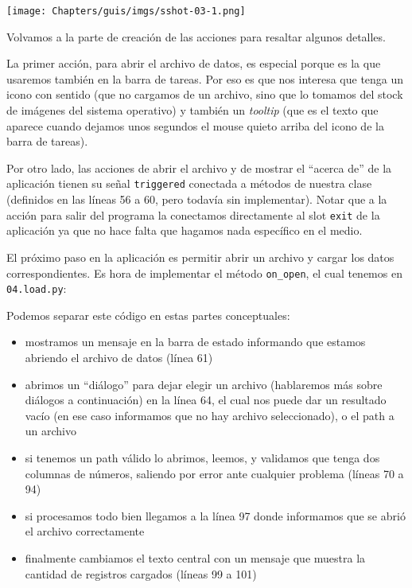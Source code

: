 \begin{center}
    \texttt{[image: Chapters/guis/imgs/sshot-03-1.png]}
\end{center}

Volvamos a la parte de creación de las acciones para resaltar algunos detalles.

La primer acción, para abrir el archivo de datos, es especial porque es la que usaremos también en la barra de tareas. Por eso es que nos interesa que tenga un icono con sentido (que no cargamos de un archivo, sino que lo tomamos del stock de imágenes del sistema operativo) y también un \textit{tooltip} (que es el texto que aparece cuando dejamos unos segundos el mouse quieto arriba del icono de la barra de tareas).

Por otro lado, las acciones de abrir el archivo y de mostrar el ``acerca de'' de la aplicación tienen su señal \texttt{triggered} conectada a métodos de nuestra clase (definidos en las líneas 56 a 60, pero todavía sin implementar). Notar que a la acción para salir del programa la conectamos directamente al slot \texttt{exit} de la aplicación ya que no hace falta que hagamos nada específico en el medio.

El próximo paso en la aplicación es permitir abrir un archivo y cargar los datos correspondientes. Es hora de implementar el método \texttt{on\_open}, el cual tenemos en \texttt{04.load.py}:


Podemos separar este código en estas partes conceptuales:

\begin{itemize}
    \item mostramos un mensaje en la barra de estado informando que estamos abriendo el archivo de datos (línea 61)
    \item abrimos un ``diálogo''  para dejar elegir un archivo (hablaremos más sobre diálogos a continuación) en la línea 64, el cual nos puede dar un resultado vacío (en ese caso informamos que no hay archivo seleccionado), o el path a un archivo
    \item si tenemos un path válido lo abrimos, leemos, y validamos que tenga dos columnas de números, saliendo por error ante cualquier problema (líneas 70 a 94)
    \item si procesamos todo bien llegamos a la línea 97 donde informamos que se abrió el archivo correctamente
    \item finalmente cambiamos el texto central con un mensaje que muestra la cantidad de registros cargados (líneas 99 a 101)
\end{itemize}

